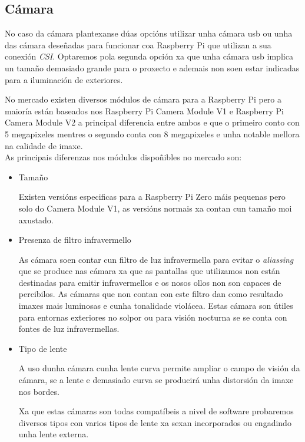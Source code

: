 \subsection{Cámara}

No caso da cámara plantexanse dúas opcións utilizar unha cámara usb ou unha das cámara deseñadas para funcionar coa Raspberry Pi que utilizan a sua conexión \emph{CSI}. Optaremos pola segunda opción xa que unha cámara usb implica un tamaño demasiado grande para o proxecto e ademais non soen estar indicadas para a iluminación de exteriores.

No mercado existen diversos módulos de cámara para a Raspberry Pi pero a maioría están baseados nos Raspberry Pi Camera Module V1 e Raspberry Pi Camera Module V2 a principal diferencia entre ambos e que o primeiro conto con 5 megapixeles mentres o segundo conta con 8 megapixeles e unha notable mellora na calidade de imaxe.\\

As principais diferenzas nos módulos dispoñibles no mercado son:
\begin{itemize}
    \item Tamaño

Existen versións especificas para a Raspberry Pi Zero máis pequenas pero solo do Camera Module V1, as versións normais xa contan cun tamaño moi axustado.

    \item Presenza de filtro infravermello

As cámara soen contar cun filtro de luz infravermella para evitar o \emph{aliassing} que se produce nas cámara xa que as pantallas que utilizamos non están destinadas para emitir infravermellos e os nosos ollos non son capaces de percibilos. As cámaras que non contan con este filtro dan como resultado imaxes mais luminosas e cunha tonalidade violácea. Estas cámara son útiles para entornas exteriores no solpor ou para visión nocturna se se conta con fontes de luz infravermellas.

    \item Tipo de lente

A uso dunha cámara cunha lente curva permite ampliar o campo de visión da cámara, se a lente e demasiado curva se producirá unha distorsión da imaxe nos bordes.

Xa que estas cámaras son todas compatíbeis a nivel de software probaremos diversos tipos con varios tipos de lente xa sexan incorporados ou engadindo unha lente externa.
\end{itemize}




